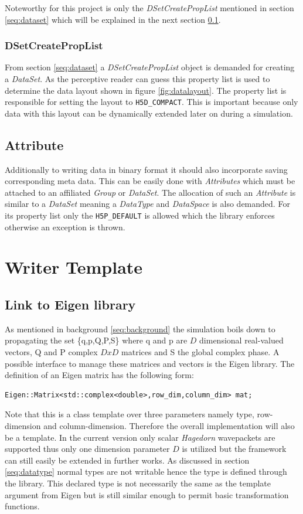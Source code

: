 Noteworthy for this project is only the \textit{DSetCreatePropList} mentioned in section \ref{seq:dataset} which will be explained in the next section \ref{seq:dscpl}.

\subsection{DSetCreatePropList}
\label{seq:dscpl}
From section \ref{seq:dataset} a \textit{DSetCreatePropList} object is demanded for creating a \textit{DataSet}. As the perceptive reader can guess this property list is used to determine the data layout shown in figure \ref{fig:datalayout}. The property list is responsible for setting the layout to \texttt{H5D\_COMPACT}. This is important because only data with this layout can be dynamically extended later on during a simulation. 

\section{Attribute}
Additionally to writing data in binary format it should also incorporate saving corresponding meta data. This can be easily done with \textit{Attributes} which must be attached to an affiliated \textit{Group} or \textit{DataSet}. The allocation of such an \textit{Attribute} is similar to a \textit{DataSet} meaning a \textit{DataType} and \textit{DataSpace} is also demanded. For its property list only the \texttt{H5P\_DEFAULT} is allowed which the library enforces otherwise an exception is thrown.

\chapter{Writer Template}
\section{Link to Eigen library}
\label{seq:linkeigen}
As mentioned in background \ref{seq:background} the simulation boils down to propagating the set \{q,p,Q,P,S\} where q and p are $D$ dimensional real-valued vectors, Q and P complex $DxD$ matrices and S the global complex phase. A possible interface to manage these matrices and vectors is the Eigen library. The definition of an Eigen matrix has the following form:
\begin{lstlisting}
Eigen::Matrix<std::complex<double>,row_dim,column_dim> mat;
\end{lstlisting}
Note that this is a class template over three parameters namely type, row-dimension and column-dimension. Therefore the overall implementation will also be a template. In the current version only scalar \textit{Hagedorn} wavepackets are supported thus only one dimension parameter $D$ is utilized but the framework can still easily be extended in further works. As discussed in section \ref{seq:datatype} normal types are not writable hence the type is defined through the library. This declared type is not necessarily the same as the template argument from Eigen but is still similar enough to permit basic transformation functions.

